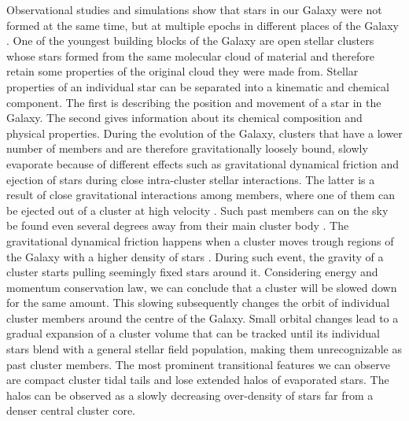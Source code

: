 Observational studies and simulations show that stars in our Galaxy were not formed at the same time, but at multiple epochs in different places of the Galaxy \cite{2001ApJ...554.1044C, 2017ARA&A..55...59N}. One of the youngest building blocks of the Galaxy are open stellar clusters whose stars formed from the same molecular cloud of material \cite{2003ARA&A..41...57L} and therefore retain some properties of the original cloud they were made from. Stellar properties of an individual star can be separated into a kinematic and chemical component. The first is describing the position and movement of a star in the Galaxy. The second gives information about its chemical composition and physical properties. During the evolution of the Galaxy, clusters that have a lower number of members and are therefore gravitationally loosely bound, slowly evaporate because of different effects such as gravitational dynamical friction and ejection of stars during close intra-cluster stellar interactions. The latter is a result of close gravitational interactions among members, where one of them can be ejected out of a cluster at high velocity \cite{2009MNRAS.396..570G, 2010MNRAS.402..105G, 2017MNRAS.470.3049R}. Such past members can on the sky be found even several degrees away from their main cluster body \cite{2007MNRAS.376L..29G, 2018MNRAS.473.4612K, 2019ApJ...884....6M}. The gravitational dynamical friction happens when a cluster moves trough regions of the Galaxy with a higher density of stars \cite{2010MNRAS.401.2753B}. During such event, the gravity of a cluster starts pulling seemingly fixed stars around it. Considering energy and momentum conservation law, we can conclude that a cluster will be slowed down for the same amount. This slowing subsequently changes the orbit of individual cluster members around the centre of the Galaxy. Small orbital changes lead to a gradual expansion of a cluster volume that can be tracked until its individual stars blend with a general stellar field population, making them unrecognizable as past cluster members. The most prominent transitional features we can observe are compact cluster tidal tails \cite{2019AA...627A...4R, 2019AJ....157..115Y, 2019AA...621L...3M, 2019arXiv191206657Z} and lose extended halos of evaporated stars. The halos can be observed as a slowly decreasing over-density \cite{2002A&A...385..471C, 2004A&A...427..485B, 2019AA...627A.119C} of stars far from a denser central cluster core.

